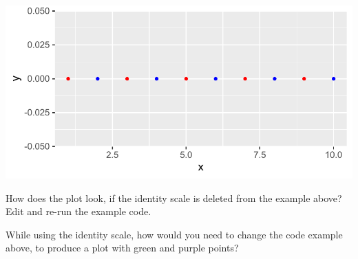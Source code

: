 \documentclass[krantz2]{krantz}\usepackage{knitr}
\begin{document}
\begin{knitrout}\footnotesize
{}\color{fgcolor}\begin{kframe}
\begin{alltt}
 \hlkwb{<-} \hlstd{(} \hlstd{=} \hlopt{:}\hlstd{,}  \hlstd{=} \hlstd{(}\hlstd{),}  \hlstd{=} \hlstd{(}\hlstd{(}\hlstd{,} \hlstd{),} \hlstd{))}

    \hlopt{+}
  \hlstd{()} \hlopt{+}
  \hlstd{()}
\end{alltt}
\end{kframe}

{\centering \includegraphics[width=.7\textwidth]{figure/pos-scale-color-10-1}

}



\end{knitrout}

\begin{playground}
How does the plot look, if the identity scale is deleted from the example above? Edit and re-run the example code.

While using the identity scale, how would you need to change the code example above, to produce a plot with green and purple points?
\end{playground}
\end{document}
